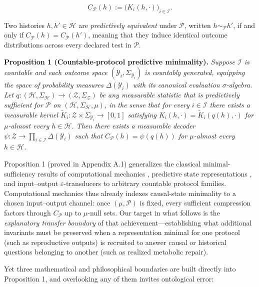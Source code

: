 \documentclass[11pt,a4paper]{article}
\begin{document}
\[C_{\mathcal{P}}(h) := \bigl(K_i(h, \cdot)\bigr)_{i \in \mathcal{I}}.\]

Two histories \(h, h' \in \mathcal{H}\) are \emph{predictively
equivalent} under \(\mathcal{P}\), written \(h \sim_{\mathcal{P}} h'\),
if and only if \(C_{\mathcal{P}}(h) = C_{\mathcal{P}}(h')\), meaning
that they induce identical outcome distributions across every declared
test in \(\mathcal{P}\).

\textbf{Proposition 1 (Countable-protocol predictive minimality).}
\emph{Suppose \(\mathcal{I}\) is countable and each outcome space
\((\mathcal{Y}_i, \Sigma_{\mathcal{Y}_i})\) is countably generated,
equipping the space of probability measures \(\Delta(\mathcal{Y}_i)\)
with its canonical evaluation \(\sigma\)-algebra. Let
\(q: (\mathcal{H}, \Sigma_{\mathcal{H}}) \to (\mathcal{Z}, \Sigma_{\mathcal{Z}})\)
be any measurable statistic that is predictively sufficient for
\(\mathcal{P}\) on \((\mathcal{H}, \Sigma_{\mathcal{H}}, \mu)\), in the
sense that for every \(i \in \mathcal{I}\) there exists a measurable
kernel
\(\widetilde{K}_i: \mathcal{Z} \times \Sigma_{\mathcal{Y}_i} \to [0,1]\)
satisfying \(K_i(h, \cdot) = \widetilde{K}_i(q(h), \cdot)\) for
\(\mu\)-almost every \(h \in \mathcal{H}\). Then there exists a
measurable decoder
\(\psi: \mathcal{Z} \to \prod_{i \in \mathcal{I}} \Delta(\mathcal{Y}_i)\)
such that \(C_{\mathcal{P}}(h) = \psi(q(h))\) for \(\mu\)-almost every
\(h \in \mathcal{H}\).}

Proposition 1 (proved in Appendix A.1) generalizes the classical
minimal-sufficiency results of computational mechanics \citep[Theorems
1--3]{crutchfieldYoung1989, shaliziCrutchfield2001}, predictive state
representations \citep{littmanSuttonSingh2001}, and input--output
\(\varepsilon\)-transducers \citep{barnettCrutchfield2015} to arbitrary
countable protocol families. Computational mechanics thus already
indexes causal-state minimality to a chosen input--output channel: once
\((\mu, \mathcal{P})\) is fixed, every sufficient compression factors
through \(C_{\mathcal{P}}\) up to \(\mu\)-null sets. Our target in what
follows is the \emph{explanatory transfer boundary} of that
achievement---establishing what additional invariants must be preserved
when a representation minimal for one protocol (such as reproductive
outputs) is recruited to answer causal or historical questions belonging
to another (such as realized metabolic repair).

Yet three mathematical and philosophical boundaries are built directly
into Proposition 1, and overlooking any of them invites ontological
error:
\end{document}
